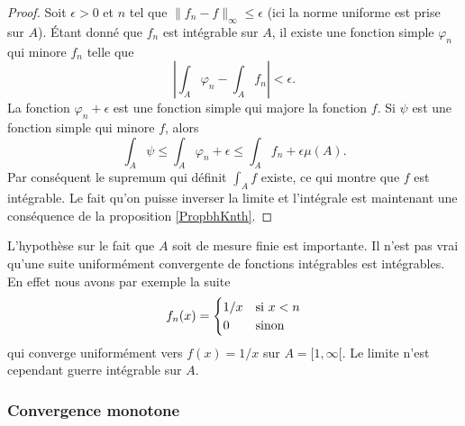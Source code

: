 \begin{proof}
    Soit \( \epsilon>0\) et \( n\) tel que \( \| f_n-f \|_{\infty}\leq \epsilon\) (ici la norme uniforme est prise sur \( A\)). Étant donné que \( f_n\) est intégrable sur \( A\), il existe une fonction simple \( \varphi_n\) qui minore \( f_n\) telle que
    \begin{equation}
        \left| \int_{A}\varphi_n-\int_A f_n \right| <\epsilon.
    \end{equation}
    La fonction \( \varphi_n+\epsilon\) est une fonction simple qui majore la fonction \( f\). Si \( \psi\) est une fonction simple qui minore \( f\), alors
    \begin{equation}
        \int_A\psi\leq\int_A\varphi_n+\epsilon\leq\int_A f_n+\epsilon\mu(A).
    \end{equation}
    Par conséquent le supremum qui définit \( \int_A f\) existe, ce qui montre que \( f\) est intégrable. Le fait qu'on puisse inverser la limite et l'intégrale est maintenant une conséquence de la proposition \ref{PropbhKnth}.
\end{proof}

\begin{remark}
    L'hypothèse sur le fait que \( A\) soit de mesure finie est importante. Il n'est pas vrai qu'une suite uniformément convergente de fonctions intégrables est intégrables. En effet nous avons par exemple la suite
    \begin{equation}
        f_n(x)=\begin{cases}
            1/x    &   \text{si \( x<n\)}\\
            0    &    \text{sinon}
        \end{cases}
    \end{equation}
    qui converge uniformément vers \( f(x)=1/x\) sur \( A=\mathopen[ 1 , \infty [\). Le limite n'est cependant guerre intégrable sur \( A\).
\end{remark}

\subsubsection{Convergence monotone}

